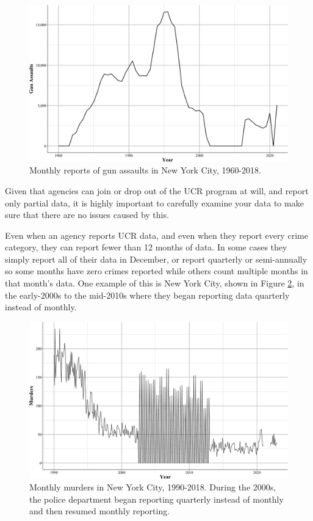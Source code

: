 \documentclass[
  12pt,
  openany]{book}
\begin{document}
\begin{figure}
\centering
\includegraphics{ucrbook_files/figure-latex/nycGunAssaults-1.pdf}
\caption{\label{fig:nycGunAssaults}Monthly reports of gun assaults in New York City, 1960-2018.}
\end{figure}

Given that agencies can join or drop out of the UCR program at will, and report only partial data, it is highly important to carefully examine your data to make sure that there are no issues caused by this.

Even when an agency reports UCR data, and even when they report every crime category, they can report fewer than 12 months of data. In some cases they simply report all of their data in December, or report quarterly or semi-annually so some months have zero crimes reported while others count multiple months in that month's data. One example of this is New York City, shown in Figure \ref{fig:nycMurderMonthly}, in the early-2000s to the mid-2010s where they began reporting data quarterly instead of monthly.

\begin{figure}
\centering
\includegraphics{ucrbook_files/figure-latex/nycMurderMonthly-1.pdf}
\caption{\label{fig:nycMurderMonthly}Monthly murders in New York City, 1990-2018. During the 2000s, the police department began reporting quarterly instead of monthly and then resumed monthly reporting.}
\end{figure}
\end{document}
